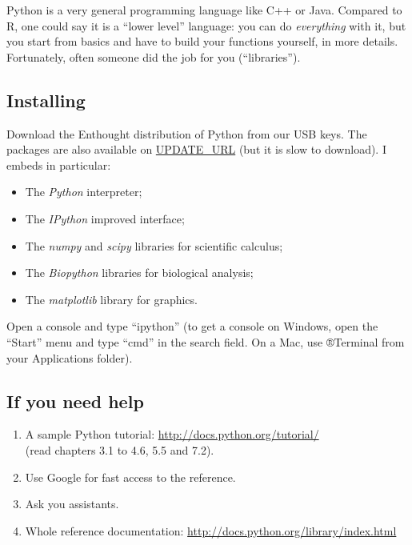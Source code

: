 \documentclass[a4paper,11pt]{article}
\begin{document}
Python is a very general programming language like C++ or Java. Compared to R, one could say it is a ``lower level'' language:
you can do {\it everything} with it, but you start from basics and have to build your functions yourself, in more details.
Fortunately, often someone did the job for you (``libraries'').

\subsection{Installing}
Download the Enthought distribution of Python from our USB keys. The packages are also available on \url{UPDATE_URL} 
(but it is slow to download). I embeds in particular:
\begin{itemize}
\item The {\it Python} interpreter;
\item The {\it IPython} improved interface;
\item The {\it numpy} and {\it scipy} libraries for scientific calculus;
\item The {\it Biopython} libraries for biological analysis;
\item The {\it matplotlib} library for graphics.
\end{itemize}

Open a console and type ``ipython''
(to get a console on Windows, open the ``Start'' menu and type ``cmd'' in the search field. On a Mac, use ®Terminal 
from your Applications folder).

\subsection{If you need help}
\begin{enumerate}
\item A sample Python tutorial: \url{http://docs.python.org/tutorial/} \\(read chapters 3.1 to 4.6, 5.5 and 7.2).
\item Use Google for fast access to the reference.
\item Ask you assistants.
\item Whole reference documentation: \url{http://docs.python.org/library/index.html}
\end{enumerate}
\end{document}

